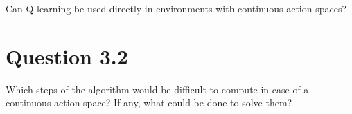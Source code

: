 \documentclass[12pt]{article}
\begin{document}
Can Q-learning be used directly in environments with continuous
action spaces?

\section*{Question 3.2}

Which steps of the algorithm would be difficult to compute in case of
a continuous action space? If any, what could be done to solve them?


\pagebreak




\end{document}

